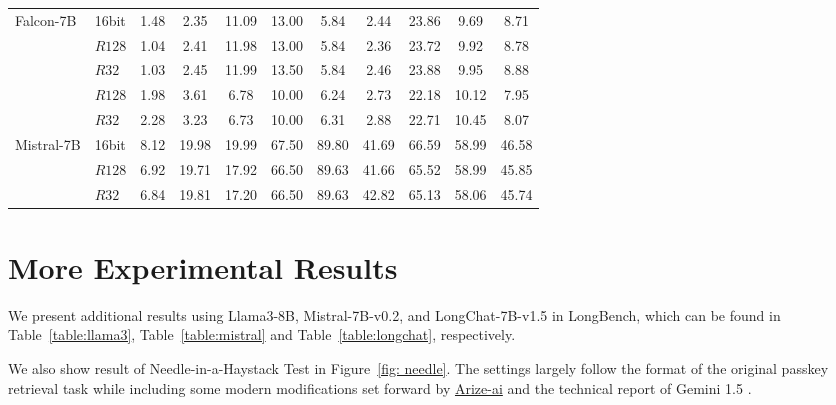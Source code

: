 \begin{table}[h!]
{\begin{tabular}{llccccccccc}
\midrule
\multirow{5}{*}{Falcon-7B}      & 16bit  & 1.48 & 2.35 & 11.09 & 13.00 & 5.84 & 2.44 & 23.86 & 9.69 & 8.71 \\
                                & \kivifour{} $R128$ & 1.04 & 2.41 & 11.98 & 13.00 & 5.84 & 2.36 & 23.72 & 9.92 & 8.78 \\
                                & \kivifour{} $R32$ & 1.03 & 2.45 & 11.99 & 13.50 & 5.84 & 2.46 & 23.88 & 9.95 & 8.88 \\
                                & \kivitwo{} $R128$ & 1.98 & 3.61 & 6.78 & 10.00 & 6.24 & 2.73 & 22.18 & 10.12 & 7.95 \\
                                & \kivitwo{} $R32$ & 2.28 & 3.23 & 6.73 & 10.00 & 6.31 & 2.88 & 22.71 & 10.45 & 8.07 \\
\midrule
\multirow{3}{*}{Mistral-7B}     & 16bit  & 8.12 & 19.98 & 19.99 & 67.50 & 89.80 & 41.69 & 66.59 & 58.99 & 46.58 \\
                                & \kivitwo{} $R128$ & 6.92 & 19.71 & 17.92 & 66.50 & 89.63 & 41.66 & 65.52 & 58.99 & 45.85 \\
                                & \kivitwo{} $R32$ & 6.84 & 19.81 & 17.20 & 66.50 & 89.63 & 42.82 & 65.13 & 58.06 & 45.74 \\
\bottomrule
\end{tabular}
}
\end{table}


\section{More Experimental Results}
\label{app: exp}

We present additional results using Llama3-8B, Mistral-7B-v0.2, and LongChat-7B-v1.5 in LongBench, which can be found in Table~\ref{table:llama3}, Table~\ref{table:mistral} and Table~\ref{table:longchat}, respectively.

We also show result of Needle-in-a-Haystack Test in Figure~\ref{fig: needle}. The settings largely follow the format of the original passkey retrieval task \citep{mohtashami2023passkey} while including some modern modifications set forward by \href{https://github.com/gkamradt/LLMTest_NeedleInAHaystack}{Arize-ai} and the technical report of Gemini 1.5 \citep{reid2024gemini}.

